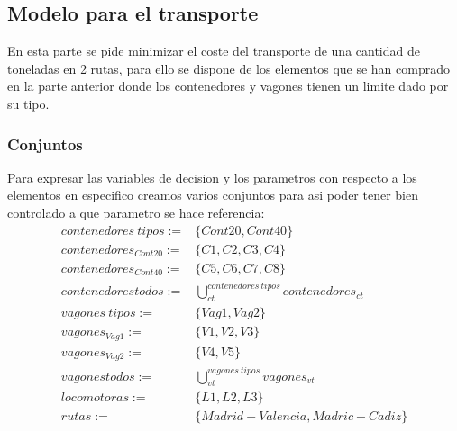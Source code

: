\documentclass[11pt,spanish]{article}
\begin{document}
		\subsection{Modelo para el transporte}
		En esta parte se pide minimizar el coste del transporte de una cantidad de toneladas en 2 rutas, para ello se dispone de los elementos que se han comprado en la parte anterior donde los contenedores y vagones tienen un limite dado por su tipo.
			\subsubsection{Conjuntos}
			Para expresar las variables de decision y los parametros con respecto a los elementos en especifico creamos varios conjuntos para asi poder tener bien controlado a que parametro se hace referencia:
			\begin{align*}
				contenedores\ tipos :=& \{ Cont20, Cont40 \} \\
				contenedores_{Cont20} :=& \{ C1, C2, C3, C4 \} \\
				contenedores_{Cont40} :=& \{ C5, C6, C7, C8 \} \\
				contenedores todos :=& \bigcup_{ct}^{contenedores\ tipos} contenedores_{ct} \\
				vagones\ tipos :=& \{ Vag1, Vag2 \} \\
				vagones_{Vag1} :=& \{ V1, V2, V3 \} \\
				vagones_{Vag2} :=& \{ V4, V5 \} \\
				vagones todos :=& \bigcup_{vt}^{vagones\ tipos} vagones_{vt} \\
				locomotoras :=& \{ L1, L2, L3 \} \\
				rutas :=& \{ Madrid-Valencia, Madric-C\acute{a}diz \}
			\end{align*}
\end{document}
